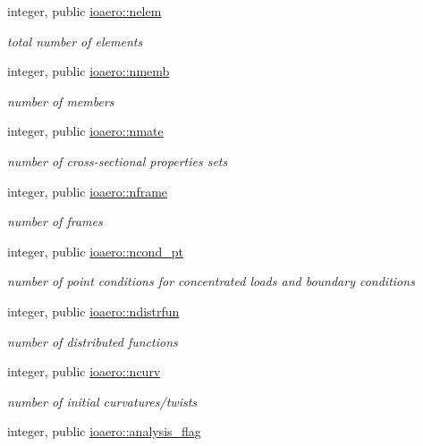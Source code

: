 \begin{DoxyCompactItemize}
integer, public \hyperlink{namespaceioaero_a543ebf3623a96606d0956211621ce254}{ioaero\+::nelem}
\begin{DoxyCompactList}\small\item\em total number of elements \end{DoxyCompactList}\item 
integer, public \hyperlink{namespaceioaero_ab59096c14b19d71fd53523822067402c}{ioaero\+::nmemb}
\begin{DoxyCompactList}\small\item\em number of members \end{DoxyCompactList}\item 
integer, public \hyperlink{namespaceioaero_ad8817641275f11b821b7720a78651531}{ioaero\+::nmate}
\begin{DoxyCompactList}\small\item\em number of cross-\/sectional properties sets \end{DoxyCompactList}\item 
integer, public \hyperlink{namespaceioaero_ac9fe2ddcc0797f81e7bc475a28692978}{ioaero\+::nframe}
\begin{DoxyCompactList}\small\item\em number of frames \end{DoxyCompactList}\item 
integer, public \hyperlink{namespaceioaero_a5ffc5d3578d9abad99d3736ba352e07d}{ioaero\+::ncond\+\_\+pt}
\begin{DoxyCompactList}\small\item\em number of point conditions for concentrated loads and boundary conditions \end{DoxyCompactList}\item 
integer, public \hyperlink{namespaceioaero_a89e1f8f2d6913d23ef482a5788d2eba5}{ioaero\+::ndistrfun}
\begin{DoxyCompactList}\small\item\em number of distributed functions \end{DoxyCompactList}\item 
integer, public \hyperlink{namespaceioaero_a34dabcb4bc1b4f260277297856ac3653}{ioaero\+::ncurv}
\begin{DoxyCompactList}\small\item\em number of initial curvatures/twists \end{DoxyCompactList}\item 
integer, public \hyperlink{namespaceioaero_a435527b09d62e7aac9883e1a6d6f3438}{ioaero\+::analysis\+\_\+flag}

\end{DoxyCompactItemize}
